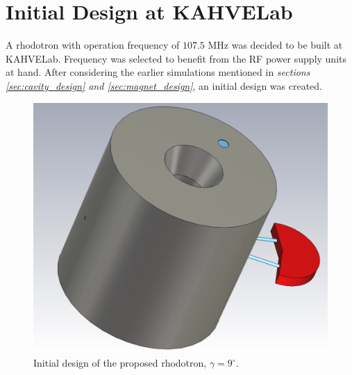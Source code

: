 \documentclass{article}
\begin{document}
\newcommand{\vecthreeBF}[1]{\vec{\textbf{#1}}}
\newcommand{\vecthree}[1]{\vec{#1}}

\newcommand{\parDeriv}[2]{\frac{\partial #1}{\partial #2}}
\newcommand{\parDerivS}[2]{\frac{\partial^2 #1}{\partial #2^2}}
\newcommand{\derivS}[2]{\frac{d^2 #1}{d#2^2}}

\newcommand{\dotProdBF}[2]{\vecthreeBF{#1} \cdot \vecthreeBF{#2}}
\newcommand{\dotProd}[2]{\vecthree{#1} \cdot \vecthree{#2}}

\newcommand{\crossProdBF}[2]{\vecthreeBF{#1} \times \vecthreeBF{#2}}
\newcommand{\crossProd}[2]{\vecthree{#1} \times \vecthree{#2}}


\newcommand{\fromeq}[1]{\textit{equation \ref{eq:#1}}}
\newcommand{\fromeqs}[2]{\textit{equations \ref{eq:#1} and \ref{eq:#2}}}
\newcommand{\fromeqsth}[3]{\textit{equations \ref{eq:#1}, \ref{eq:#2} and \ref{eq:#3}}}

\newcommand{\fromfig}[1]{\textit{figure \ref{fig:#1}}}
\newcommand{\fromfigs}[2]{\textit{figures \ref{fig:#1} and \ref{fig:#2}}}

\newcommand{\fromsec}[1]{\textit{section \ref{sec:#1}}}
\newcommand{\fromsecs}[2]{\textit{sections \ref{sec:#1} and \ref{sec:#2}}}



\section{Initial Design at KAHVELab} 

A rhodotron with operation frequency of $107.5$ MHz was decided to be built at KAHVELab. 
Frequency was selected to benefit from the RF power supply units at hand.
After considering the earlier simulations mentioned in \fromsecs{cavity_design}{magnet_design}, an initial design was created.

\vspace{20pt}
\begin{figure}[H]
    \centering
    \includegraphics[width=.7\linewidth]{../../../figures/cst/cst_first_design1.png}
    \vspace{0pt}
    \caption{Initial design of the proposed rhodotron, $\gamma=9^\circ$.}
    \label{fig:initial_design}
    \vspace{-10pt}
\end{figure}
\end{document}
